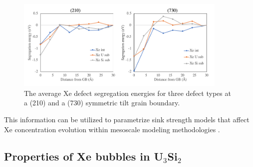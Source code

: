 \documentclass[review]{elsarticle}
\begin{document}
\begin{figure}[hbt]
	\centering
	\includegraphics[width=0.9\textwidth]{Xe_Eseg.png}
 \caption{The average Xe defect segregation energies for three defect types at a (210) and a (730) symmetric tilt grain boundary.}\label{fig:xeseg}
\end{figure}

\FloatBarrier

This information can be utilized to parametrize sink strength models that affect Xe concentration evolution within mesoscale modeling methodologies \cite{was2007}.

\subsection{Properties of Xe bubbles in U$_3$Si$_2$}
\end{document}
